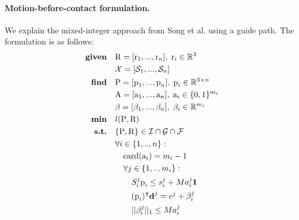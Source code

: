 
\paragraph{Motion-before-contact formulation.\label{par:mip:mbc:formulation}}
We explain the mixed-integer approach from Song et al. \cite{sl1m_v2} using a guide path. 
The formulation is as follows:
\begin{align}
    \textrm{\textbf{given}} \quad & \mbox{R}=[\mbox{r}_1,...,\mbox{r}_n], \; \mbox{r}_i \in \mathbb{R}^{3} \label{eq:mbc:mip_complete:rotation}\\
                            \quad &\mathcal{X}=[\mathcal{S}_1, ..., \mathcal{S}_n] \label{eq:mbc:mip_complete:surf_pruned}\\
    \textrm{\textbf{find}}  \quad & \mbox{P}=[\mbox{p}_1,...,\mbox{p}_n], \;\mbox{p}_i \in \mathbb{R}^{3 \times n} \nonumber\\
                            \quad & \mbox{A}=[\mbox{a}_1,...,\mbox{a}_n], \; \mbox{a}_i \in \{0,1\}^{m_i} \nonumber \\
                            \quad & \beta=[\beta_1,...,\beta_n], \; \beta_i \in \mathbb{R}^{m_i} \nonumber\\
    \textrm{\textbf{min}}  \quad & l(\mbox{P},\mbox{R}) \nonumber\\
    \textrm{\textbf{s.t.}}  \quad & \{\mbox{P},\mbox{R}\} \in \mathcal{I} \cap \mathcal{G} \cap \mathcal{F} \nonumber\\
                            \quad & \forall i \in \{1,..,n\} : \nonumber\\
                                \quad & \quad \mbox{card}(\mbox{a}_i) = m_i-1 \nonumber \\
                                \quad & \quad \forall j \in \{1,..,m_i\} : \label{eq:mbc:mip_complete:surf_cand}\\
                                    \quad & \quad \quad S_i^j\mbox{p}_i \leq s_i^j + M a_i^j \textbf{1}  \nonumber\\
                                    \quad & \quad \quad (\mbox{p}_i)^{\intercal} \textbf{d}^j = e^j + \beta_i^j \nonumber\\
                                    \quad & \quad \quad ||\beta_i^j||_1 \leq M a_i^j \nonumber\\
                                    \nonumber
\end{align}

